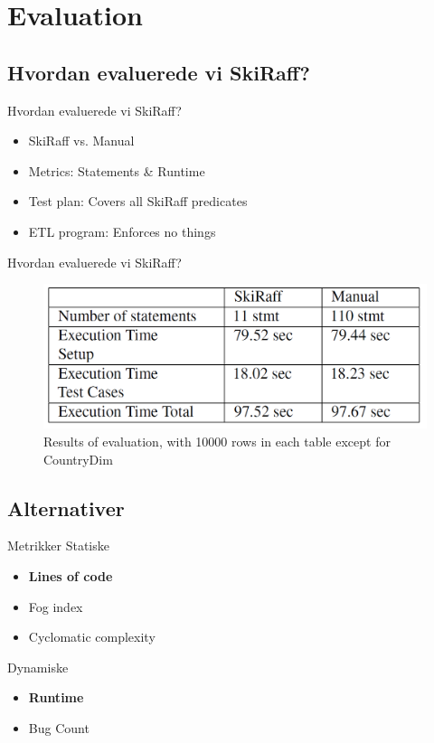 \section{Evaluation}
\subsection{Hvordan evaluerede vi SkiRaff?}

\begin{frame}{Hvordan evaluerede vi SkiRaff?}{}
  \begin{itemize}
    \item<1-> SkiRaff vs. Manual
    \item<2-> Metrics: Statements \& Runtime
    \item<3-> Test plan: Covers all SkiRaff predicates
    \item<4-> ETL program: Enforces no things
  \end{itemize}
\end{frame}

\begin{frame}{Hvordan evaluerede vi SkiRaff?}{}
   \begin{figure}
        \centering
        \includegraphics[width=1\textwidth]{figures/EvalResults.png}
        \caption{Results of evaluation, with 10000 rows in each table except for CountryDim}
        \label{Results of evaluation}
    \end{figure}
\end{frame}

\subsection{Alternativer}
\begin{frame}{Metrikker}{}
Statiske
  \begin{itemize}
    \item<1-> \textbf{Lines of code}
    \item<2-> Fog index
    \item<3-> Cyclomatic complexity
  	\end{itemize}

\pause
\pause
\pause
Dynamiske
  \begin{itemize}
    \item<4-> \textbf{Runtime}
    \item<5-> Bug Count
  	\end{itemize}
\end{frame}



